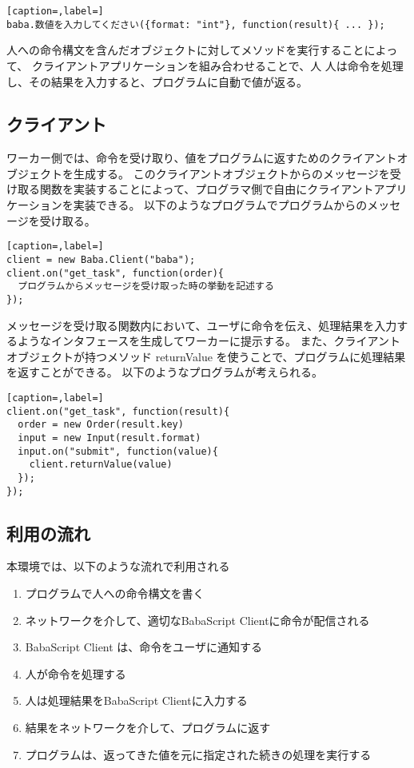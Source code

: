 \documentclass{deimj}
\begin{document}
\begin{lstlisting}[caption=,label=]
baba.数値を入力してください({format: "int"}, function(result){ ... });
\end{lstlisting}

人への命令構文を含んだオブジェクトに対してメソッドを実行することによって、
クライアントアプリケーションを組み合わせることで、人
人は命令を処理し、その結果を入力すると、プログラムに自動で値が返る。

\subsection{クライアント}

ワーカー側では、命令を受け取り、値をプログラムに返すためのクライアントオブジェクトを生成する。
このクライアントオブジェクトからのメッセージを受け取る関数を実装することによって、プログラマ側で自由にクライアントアプリケーションを実装できる。
以下のようなプログラムでプログラムからのメッセージを受け取る。

\begin{lstlisting}[caption=,label=]
client = new Baba.Client("baba");
client.on("get_task", function(order){
  プログラムからメッセージを受け取った時の挙動を記述する
});
\end{lstlisting}

メッセージを受け取る関数内において、ユーザに命令を伝え、処理結果を入力するようなインタフェースを生成してワーカーに提示する。
また、クライアントオブジェクトが持つメソッド returnValue を使うことで、プログラムに処理結果を返すことができる。
以下のようなプログラムが考えられる。

\begin{lstlisting}[caption=,label=]
client.on("get_task", function(result){
  order = new Order(result.key)
  input = new Input(result.format)
  input.on("submit", function(value){
    client.returnValue(value)
  });  
});
\end{lstlisting}
  
  
\subsection{利用の流れ}
本環境では、以下のような流れで利用される

\begin{enumerate}
\item プログラムで人への命令構文を書く
\item ネットワークを介して、適切なBabaScript Clientに命令が配信される
\item BabaScript Client は、命令をユーザに通知する
\item 人が命令を処理する
\item 人は処理結果をBabaScript Clientに入力する
\item 結果をネットワークを介して、プログラムに返す
\item プログラムは、返ってきた値を元に指定された続きの処理を実行する
\end{enumerate}
\end{document}
